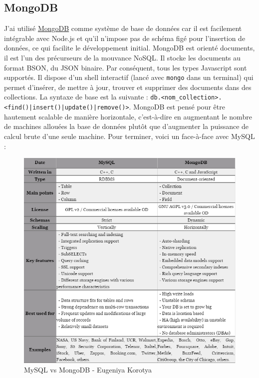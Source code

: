 \documentclass[a4paper, 12pt]{article}
\begin{document}
\subsection{MongoDB}
J'ai utilisé \href{https://www.mongodb.com/}{MongoDB} comme système de base de données car il est facilement intégrable avec Node.js et qu'il n'impose
pas de schéma figé pour l'insertion de données, ce qui facilite le développement initial. MongoDB est orienté documents,
il est l'un des précurseurs de la mouvance NoSQL. Il stocke les documents au format BSON, du JSON binaire. Par conséquent,
tous les types Javascript sont supportés. Il dispose d'un shell interactif (lancé avec \texttt{mongo} dans
un terminal) qui permet d'insérer, de mettre à jour, trouver et supprimer des documents dans des collections. La syntaxe
de base est la suivante : \texttt{db.<nom_collection>.<find()|insert()|update()|remove()>}. MongoDB est pensé
pour être hautement scalable de manière horizontale, c'est-à-dire en augmentant le nombre de machines allouées la base de
données plutôt que d'augmenter la puissance de calcul brute d'une seule machine. Pour terminer, voici un face-à-face avec MySQL :
\begin{figure}
    \begin{center}
        \includegraphics[width=1\textwidth]{images/mysql_mongodb.png}
    \end{center}
    \caption{MySQL vs MongoDB - Eugeniya Korotya \cite{ref160}}
\end{figure}
\end{document}
